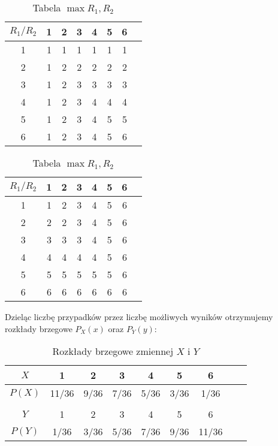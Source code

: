 \documentclass{article}
\begin{document}
\begin{table}[h]
    \centering
    \begin{minipage}{0.5\textwidth}
        \centering
        \begin{tabular}{c|ccccccc}
            $R_1/R_2$ & 1 & 2 & 3 & 4 & 5 & 6 \\ \bottomrule
            1 & 1 & 1 & 1 & 1 & 1 & 1 & \\
            2 & 1 & 2 & 2 & 2 & 2 & 2 & \\
            3 & 1 & 2 & 3 & 3 & 3 & 3 & \\
            4 & 1 & 2 & 3 & 4 & 4 & 4 & \\
            5 & 1 & 2 & 3 & 4 & 5 & 5 & \\
            6 & 1 & 2 & 3 & 4 & 5 & 6 &
        \end{tabular}
        \caption{Tabela $\min{R_1,R_2}$}
    \end{minipage}%
    \begin{minipage}{0.5\textwidth}
        \centering
        \begin{tabular}{c|ccccccc}
            $R_1/R_2$ & 1 & 2 & 3 & 4 & 5 & 6 \\ \bottomrule
            1 & 1 & 2 & 3 & 4 & 5 & 6 & \\
            2 & 2 & 2 & 3 & 4 & 5 & 6 & \\
            3 & 3 & 3 & 3 & 4 & 5 & 6 & \\
            4 & 4 & 4 & 4 & 4 & 5 & 6 & \\
            5 & 5 & 5 & 5 & 5 & 5 & 6 & \\
            6 & 6 & 6 & 6 & 6 & 6 & 6 &
        \end{tabular}
        \caption{Tabela $\max{R_1,R_2}$}
    \end{minipage}
\end{table}
\noindent
Dzieląc liczbę przypadków przez liczbę możliwych wyników otrzymujemy
rozkłady brzegowe $P_X(x)$ oraz $P_Y(y)$:
\begin{table}[h]
    \centering  
    \begin{tabular}{c|cccccccc}
        $X$ & 1 & 2 & 3 & 4 & 5 & 6 & & \\ \toprule
        $P(X)$ & 11/36 & 9/36 & 7/36 & 5/36 & 3/36 & 1/36 & & \\ \bottomrule
        \\
        $Y$ & 1 & 2 & 3 & 4 & 5 & 6 & & \\ \toprule
        $P(Y)$ & 1/36 & 3/36 & 5/36 & 7/36 & 9/36 & 11/36 & & \\ \bottomrule
    \end{tabular}
    \caption{Rozkłady brzegowe zmiennej $X$ i $Y$}
\end{table}
\end{document}
